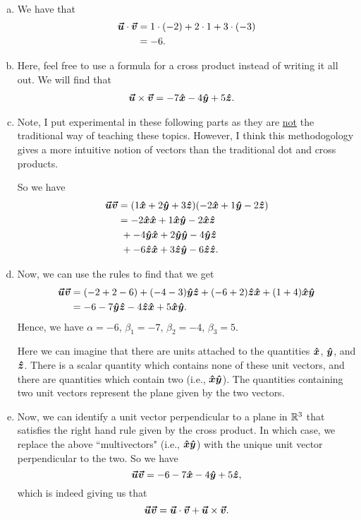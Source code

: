\documentclass[12pt]{article} %
\begin{document}
\begin{solution}~
\begin{enumerate}[(a)]
    \item We have that
    \begin{align*}
        \boldsymbol{\vec{u}} \cdot \boldsymbol{\vec{v}} &= 1\cdot (-2) + 2 \cdot 1 + 3 \cdot (-3)\\
        &= -6.
    \end{align*}
    \item Here, feel free to use a formula for a cross product instead of writing it all out.  We will find that
    \begin{align*}
        \boldsymbol{\vec{u}} \times \boldsymbol{\vec{v}} &= -7\boldsymbol{\hat{x}} -4\boldsymbol{\hat{y}} +5\boldsymbol{\hat{z}}.
    \end{align*}
    \item Note, I put experimental in these following parts as they are \underline{not} the traditional way of teaching these topics. However, I think this methodogology gives a more intuitive notion of vectors than the traditional dot and cross products.
    
    So we have
    \begin{align*}
        \boldsymbol{\vec{u}} \boldsymbol{\vec{v}} &= (1\boldsymbol{\hat{x}} + 2\boldsymbol{\hat{y}} +3\boldsymbol{\hat{z}})(-2\boldsymbol{\hat{x}} +1\boldsymbol{\hat{y}} -2\boldsymbol{\hat{z}})\\
        &= -2\boldsymbol{\hat{x}}\boldsymbol{\hat{x}} + 1 \boldsymbol{\hat{x}} \boldsymbol{\hat{y}} - 2\boldsymbol{\hat{x}} \boldsymbol{\hat{z}} \\
        &~ + -4\boldsymbol{\hat{y}} \boldsymbol{\hat{x}} + 2\boldsymbol{\hat{y}} \boldsymbol{\hat{y}} -4\boldsymbol{\hat{y}} \boldsymbol{\hat{z}} \\
        &~ + -6\boldsymbol{\hat{z}} \boldsymbol{\hat{x}} +3\boldsymbol{\hat{z}} \boldsymbol{\hat{y}} -6\boldsymbol{\hat{z}} \boldsymbol{\hat{z}}.
    \end{align*}
    \item Now, we can use the rules to find that we get
    \begin{align*}
        \boldsymbol{\vec{u}}\boldsymbol{\vec{v}} &= (-2 +2 - 6) + (-4-3)\boldsymbol{\hat{y}} \boldsymbol{\hat{z}} + (-6+2)\boldsymbol{\hat{z}} \boldsymbol{\hat{x}} + (1+4)\boldsymbol{\hat{x}} \boldsymbol{\hat{y}}\\
        &= -6  -7 \boldsymbol{\hat{y}} \boldsymbol{\hat{z}} - 4\boldsymbol{\hat{z}} \boldsymbol{\hat{x}} +5 \boldsymbol{\hat{x}} \boldsymbol{\hat{y}}.
    \end{align*}
    Hence, we have $\alpha = -6$, $\beta_1 = -7$, $\beta_2=-4$, $\beta_3 = 5$.
    
    Here we can imagine that there are units attached to the quantities $\boldsymbol{\hat{x}}$, $\boldsymbol{\hat{y}}$, and $\boldsymbol{\hat{z}}$.  There is a scalar quantity which contains none of these unit vectors, and there are quantities which contain two (i.e., $\boldsymbol{\hat{x}}\boldsymbol{\hat{y}}$).  The quantities containing two unit vectors represent the plane given by the two vectors.
    \item Now, we can identify a unit vector perpendicular to a plane in $\mathbb{R}^3$ that satisfies the right hand rule given by the cross product.  In which case, we replace the above ``multivectors" (i.e., $\boldsymbol{\hat{x}}\boldsymbol{\hat{y}}$) with the unique unit vector perpendicular to the two.  So we have
    \[
    \boldsymbol{\vec{u}} \boldsymbol{\vec{v}} = -6 -7\boldsymbol{\hat{x}} -4\boldsymbol{\hat{y}} +5\boldsymbol{\hat{z}},
    \]
    which is indeed giving us that
    \[
    \boldsymbol{\vec{u}} \boldsymbol{\vec{v}} = \boldsymbol{\vec{u}}\cdot \boldsymbol{\vec{v}} + \boldsymbol{\vec{u}} \times \boldsymbol{\vec{v}}.
    \]
\end{enumerate}


\end{solution}
\end{document}
